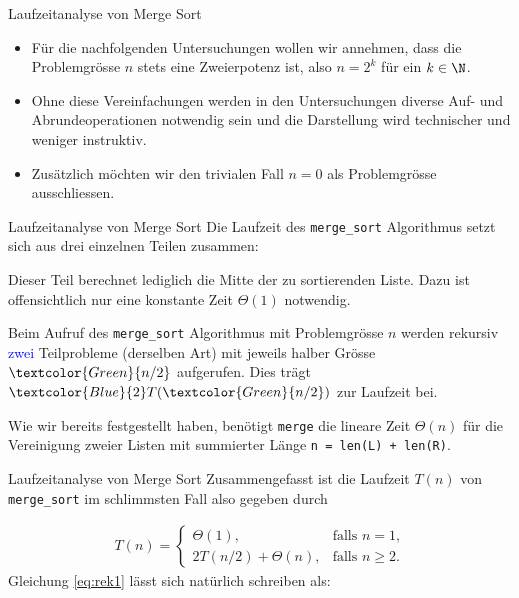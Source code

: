 \begin{frame}[fragile]{Laufzeitanalyse von Merge Sort}
    \begin{itemize}[<+->]
        \item Für die nachfolgenden Untersuchungen wollen wir annehmen, dass die Problemgrösse $n$ stets eine Zweierpotenz ist, also $n = 2^k$ für ein $k\in\N$.
        \item Ohne diese Vereinfachungen werden in den Untersuchungen diverse Auf- und Abrundeoperationen notwendig sein und die Darstellung wird technischer und weniger instruktiv.
        \item Zusätzlich möchten wir den trivialen Fall $n = 0$ als Problemgrösse ausschliessen.
    \end{itemize}
\end{frame}

\begin{frame}[fragile]{Laufzeitanalyse von Merge Sort}
Die Laufzeit des \lstinline{merge_sort} Algorithmus setzt sich aus drei einzelnen Teilen zusammen:
\begin{description}[<+->]
	\item[Divide:] Dieser Teil berechnet lediglich die Mitte der zu sortierenden Liste. Dazu ist offensichtlich nur eine konstante Zeit $\Theta(1)$ notwendig.
	\item[Conquer:] Beim Aufruf des \lstinline{merge_sort} Algorithmus mit Problemgrösse $n$ werden rekursiv \textcolor{Blue}{zwei} Teilprobleme (derselben Art) mit jeweils halber Grösse $\textcolor{Green}{n/2}$ aufgerufen. Dies trägt $\textcolor{Blue}{2}T(\textcolor{Green}{n/2})$ zur Laufzeit bei.
	\item[Combine:] Wie wir bereits festgestellt haben, benötigt \lstinline{merge} die lineare Zeit $\Theta(n)$ für die Vereinigung zweier Listen mit summierter Länge \lstinline|n = len(L) + len(R)|.
\end{description}
\end{frame}

\begin{frame}[fragile]{Laufzeitanalyse von Merge Sort}
Zusammengefasst ist die Laufzeit $T(n)$ von \lstinline{merge_sort} im schlimmsten Fall also gegeben durch

\begin{align}\label{eq:rek1}
	T(n) =
	\begin{cases}
		\Theta(1),           & \text{falls $n = 1$,}   \\
		2T(n/2) + \Theta(n), & \text{falls $n\geq 2$}.
	\end{cases}
\end{align}
Gleichung \ref{eq:rek1} lässt sich natürlich schreiben als:
\end{frame}


